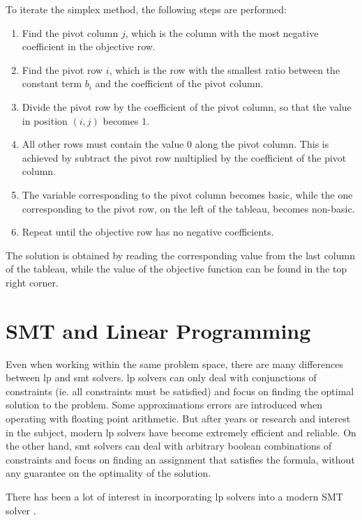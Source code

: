To iterate the simplex method, the following steps are performed:

\begin{enumerate}
    \item Find the pivot column $j$, which is the column with the most negative coefficient in the objective row.
    \item Find the pivot row $i$, which is the row with the smallest ratio between the constant term $b_i$ and the coefficient of the pivot column.
    \item Divide the pivot row by the coefficient of the pivot column, so that the value in position $(i, j)$ becomes $1$.
    \item All other rows must contain the value $0$ along the pivot column. This is achieved by subtract the pivot row multiplied by the coefficient of the pivot column.
    \item The variable corresponding to the pivot column becomes basic, while the one corresponding to the pivot row, on the left of the tableau, becomes non-basic.
    \item Repeat until the objective row has no negative coefficients.
\end{enumerate}

The solution is obtained by reading the corresponding value from the last column of the tableau, while the value of the objective function can be found in the top right corner.

\section{SMT and Linear Programming}

Even when working within the same problem space, there are many differences between \gls{lp} and \gls{smt} solvers.
\gls{lp} solvers can only deal with conjunctions of constraints (ie. all constraints must be satisfied) and focus on finding the optimal solution to the problem.
Some approximations errors are introduced when operating with floating point arithmetic.
But after years or research and interest in the subject, modern \gls{lp} solvers have become extremely efficient and reliable.
On the other hand, \gls{smt} solvers can deal with arbitrary boolean combinations of constraints and focus on finding an assignment that satisfies the formula, without any guarantee on the optimality of the solution.

There has been a lot of interest in incorporating \gls{lp} solvers into a modern SMT solver \cite{paper:lp-for-smt}.

\cite{paper:lp-for-smt} \cite{paper:delta-complete}
